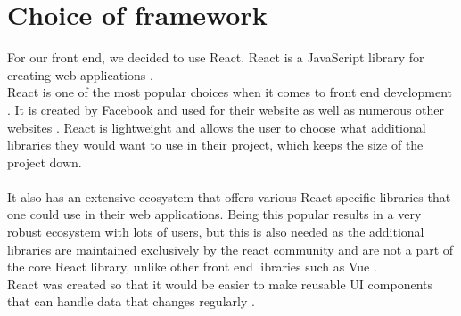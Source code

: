 \section{Choice of framework}
For our front end, we decided to use React.
React is a JavaScript library for creating web applications \cite{ReactJS}. 
\\
React is one of the most popular choices when it comes to front end development \cite{NPMVueReactAngular}.
It is created by Facebook and used for their website as well as numerous other websites \cite{ReactHistory}.
React is lightweight and allows the user to choose what additional libraries they would want to use in their project, which keeps the size of the project down.
\\\\
It also has an extensive ecosystem that offers various React specific libraries that one could use in their web applications.
Being this popular results in a very robust ecosystem with lots of users, but this is also needed as the additional libraries are maintained exclusively by the react community and are not a part of the core React library, unlike other front end libraries such as Vue \cite{Vue}.
\\
React was created so that it would be easier to make reusable UI components that can handle data that changes regularly \cite{ReactHistory}.